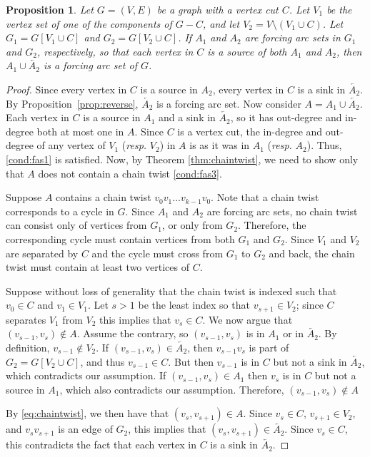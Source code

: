 \documentclass[12pt]{amsart}
\theoremstyle{plain}
\newtheorem{proposition}[theorem]{Proposition}
\theoremstyle{definition}
\begin{document}
\begin{proposition}\label{prop:cut}
    Let $G=(V,E)$ be a graph with a vertex cut $C$. Let $V_1$ be the vertex set of one of the components of $G-C$, and let $V_2=V\setminus (V_1\cup C)$. Let $G_1=G[V_1\cup C]$ and $G_2=G[V_2\cup C]$. If $A_1$ and $A_2$ are forcing arc sets in $G_1$ and $G_2$, respectively, so that each vertex in $C$ is a source of both $A_1$ and $A_2$, then $A_1\cup \overleftarrow{A_2}$ is a forcing arc set of $G$.   
\end{proposition}
%
\begin{proof}
Since every vertex in $C$ is a source in $A_2$, every vertex in $C$ is a sink in $\overleftarrow{A_2}$. By Proposition~\ref{prop:reverse}, $\overleftarrow{A_2} $ is a forcing arc set. Now consider $A=A_1\cup \overleftarrow{A_2}$. Each vertex in $C$ is a source in $A_1$ and a sink in $\overleftarrow{A_2}$, so it has out-degree and in-degree both at most one in $A$. 
Since $C$ is a vertex cut, the in-degree and out-degree of any vertex of $V_1$ ({\em resp. }$V_2$) in $A$ is as it was in $A_1$ ({\em resp.} $A_2$).
Thus, \ref{cond:fas1} is satisfied. Now, by Theorem \ref{thm:chaintwist}, we need to show only that $A$ does not contain a chain twist \ref{cond:fas3}. 


Suppose $A$ contains a chain twist $v_0v_1\dots v_{k-1}v_0$.
Note that a chain twist corresponds to a cycle in $G$. 
Since $A_1$ and $A_2$ are forcing arc sets,  no chain twist can consist only of vertices from $G_1$, or only from $G_2$.
Therefore, the corresponding cycle must contain vertices from both $G_1$ and $G_2$. Since $V_1$ and $V_2$ are separated by $C$ and the cycle must cross from $G_1$ to $G_2$ and back, the chain twist must contain at least two vertices of $C$. 

Suppose without loss of generality that the chain twist is indexed such that $v_0\in C$ and $v_1\in V_1$. Let $s>1$ be the least index so that $v_{s+1}\in V_2$; since $C$ separates $V_1$ from $V_2$ this implies that $v_s\in C$. 
%
We now argue that $(v_{s-1},v_s)\not \in A$. Assume the contrary, so $(v_{s-1},v_s)$ is in $A_1$ or in $\overleftarrow{A_2}$. By definition, $v_{s-1}\not\in V_2$. If $(v_{s-1},v_s)\in \overleftarrow{A_2}$, then $v_{s-1}v_s$ is part of $G_2=G[V_2\cup C]$, and thus $v_{s-1}\in C$. But then $v_{s-1}$ is in $C$ but not a sink in $\overleftarrow{A_2}$, which contradicts our assumption. If  $(v_{s-1},v_s)\in A_1$ then $v_s$ is in $C$ but not a source in $A_1$, which also contradicts our assumption. Therefore, $(v_{s-1},v_s)\not \in A$

By \eqref{eq:chaintwist}, we then have that $(v_s,v_{s+1})\in A$. 
Since $v_s\in C$, $v_{s+1}\in V_2$, and $v_sv_{s+1}$ is an edge of $G_2$, this implies that $(v_s,v_{s+1})\in \overleftarrow{A_2}$. Since $v_s\in C$, this contradicts the fact that each vertex in $C$ is a sink in $\overleftarrow{A_2}$. 
\end{proof}
\end{document}
